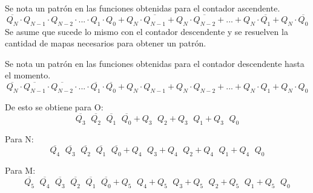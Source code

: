 \documentclass{article}
\begin{document}
Se nota un patrón en las funciones obtenidas para el contador ascendente.
\begin{equation*}
\overline{Q_N} \cdot Q_{N-1} \cdot Q_{N-2} \cdot ... \cdot Q_1 \cdot Q_0 +
Q_N \cdot \overline{Q_{N-1}} +
Q_N \cdot \overline{Q_{N-2}} +
... +
Q_N \cdot \overline{Q_1} +
Q_N \cdot \overline{Q_0}
\end{equation*}
Se asume que sucede lo mismo con
el contador descendente y se resuelven la cantidad de mapas necesarios para
obtener un patrón.






Se nota un patrón en las funciones obtenidas para el contador descendente hasta el momento.
\begin{equation*}
\overline{Q_N} \cdot \overline{Q_{N-1}} \cdot \overline{Q_{N-2}} \cdot ... \cdot \overline{Q_1} \cdot \overline{Q_0} +
Q_N \cdot Q_{N-1} +
Q_N \cdot Q_{N-2} +
... +
Q_N \cdot Q_1 +
Q_N \cdot Q_0
\end{equation*}

De esto se obtiene para O:
\begin{equation*}
\overline{Q_3} \phantom{\cdot} \overline{Q_2} \phantom{\cdot} \overline{Q_1} \phantom{\cdot} \overline{Q_0} +
Q_3 \phantom{\cdot} Q_2 +
Q_3 \phantom{\cdot} Q_1 +
Q_3 \phantom{\cdot} Q_0
\end{equation*}

Para N:
\begin{equation*}
\overline{Q_4} \phantom{\cdot} \overline{Q_3} \phantom{\cdot} \overline{Q_2} \phantom{\cdot} \overline{Q_1} \phantom{\cdot} \overline{Q_0} +
Q_4 \phantom{\cdot} Q_3 +
Q_4 \phantom{\cdot} Q_2 +
Q_4 \phantom{\cdot} Q_1 +
Q_4 \phantom{\cdot} Q_0
\end{equation*}

Para M:
\begin{equation*}
\overline{Q_5} \phantom{\cdot} \overline{Q_4} \phantom{\cdot} \overline{Q_3} \phantom{\cdot} \overline{Q_2} \phantom{\cdot} \overline{Q_1} \phantom{\cdot} \overline{Q_0} +
Q_5 \phantom{\cdot} Q_4 +
Q_5 \phantom{\cdot} Q_3 +
Q_5 \phantom{\cdot} Q_2 +
Q_5 \phantom{\cdot} Q_1 +
Q_5 \phantom{\cdot} Q_0
\end{equation*}
\end{document}
